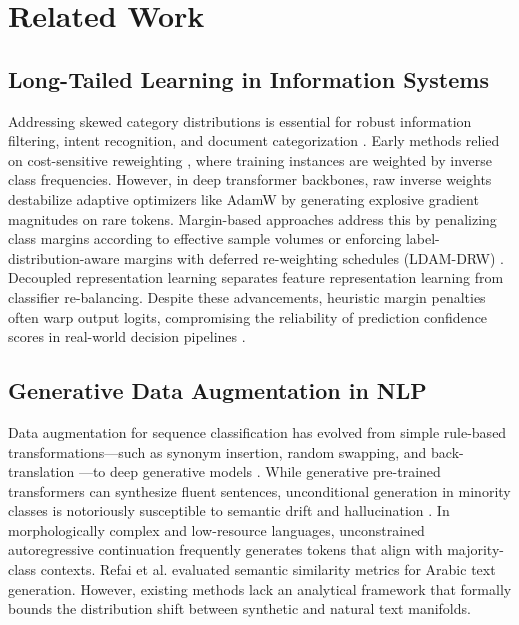 \documentclass[final,5p,times,twocolumn]{elsarticle}
\begin{document}
\section{Related Work}
\label{sec:related_work}

\subsection{Long-Tailed Learning in Information Systems}
Addressing skewed category distributions is essential for robust information filtering, intent recognition, and document categorization \cite{he2009learning, zhang2023deep}. Early methods relied on cost-sensitive reweighting \cite{alshammari2022long}, where training instances are weighted by inverse class frequencies. However, in deep transformer backbones, raw inverse weights destabilize adaptive optimizers like AdamW by generating explosive gradient magnitudes on rare tokens. Margin-based approaches address this by penalizing class margins according to effective sample volumes \cite{cui2019class} or enforcing label-distribution-aware margins with deferred re-weighting schedules (LDAM-DRW) \cite{cao2019learning}. Decoupled representation learning \cite{kang2021exploring} separates feature representation learning from classifier re-balancing. Despite these advancements, heuristic margin penalties often warp output logits, compromising the reliability of prediction confidence scores in real-world decision pipelines \cite{guo2017calibration, minderer2021revisiting}.

\subsection{Generative Data Augmentation in NLP}
Data augmentation for sequence classification has evolved from simple rule-based transformations—such as synonym insertion, random swapping, and back-translation \cite{wei2019eda, shorten2021text}—to deep generative models \cite{kumar2020data, refai2023data, dai2023augmenting}. While generative pre-trained transformers can synthesize fluent sentences, unconditional generation in minority classes is notoriously susceptible to semantic drift and hallucination \cite{yoo2021gpt3mix, ding2024gpt4}. In morphologically complex and low-resource languages, unconstrained autoregressive continuation frequently generates tokens that align with majority-class contexts. Refai et al. \cite{refai2023data} evaluated semantic similarity metrics for Arabic text generation. However, existing methods lack an analytical framework that formally bounds the distribution shift between synthetic and natural text manifolds.
\end{document}
